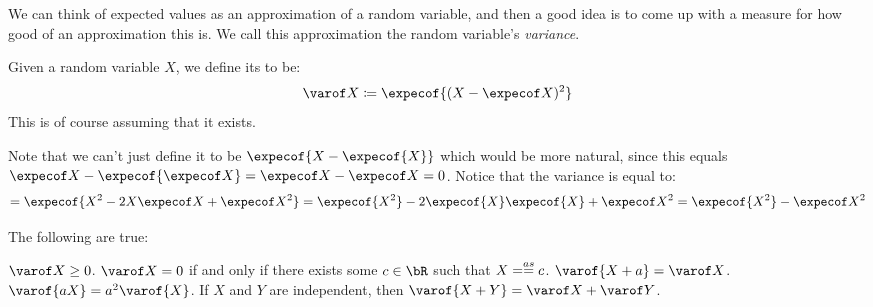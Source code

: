 We can think of expected values as an approximation of a random variable, and then a good idea is to come up with
a measure for how good of an approximation this is.
We call this approximation the random variable's \emph{variance}.

\begin{defn*}

	Given a random variable $X$, we define its  to be:
	\[ \varof X\coloneqq\expecof{(X-\expecof X)^2} \]
	This is of course assuming that it exists.

\end{defn*}

Note that we can't just define it to be $\expecof{X-\expecof{X}}$ which would be more natural, since this equals
$\expecof X-\expecof{\expecof X} = \expecof X-\expecof X = 0$.
Notice that the variance is equal to:
\[ = \expecof{X^2 - 2X\expecof X + \expecof X^2} = \expecof{X^2} - 2\expecof{X}\expecof{X} + \expecof X^2
= \expecof{X^2} - \expecof X^2 \]

\begin{thrm*}[varTraitsTheorem]

	The following are true:
	\begin{msecenumerate}
		\mitem $\varof X\geq0$.
		\mitem $\varof X=0$ if and only if there exists some $c\in\bR$ such that $X=\mathrel{\overset{as}=} c$.
		\mitem $\varof{X+a}=\varof X$.
		\mitem $\varof{aX}=a^2\varof{X}$.
		\mitem If $X$ and $Y$ are independent, then $\varof{X+Y}=\varof X+\varof Y$.
	\end{msecenumerate}

\end{thrm*}

